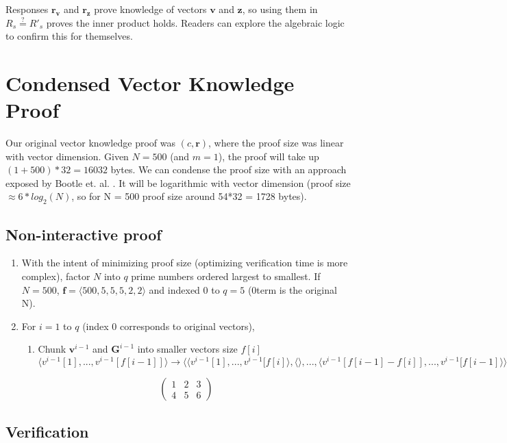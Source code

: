 Responses $\boldsymbol{r_v}$ and $\boldsymbol{r_z}$ prove knowledge of vectors $\boldsymbol{v}$ and $\boldsymbol{z}$, so using them in $R_s \stackrel{?}{=} R'_s$ proves the inner product holds. Readers can explore the algebraic logic to confirm this for themselves.


\section{Condensed Vector Knowledge Proof}
\label{sec:condensedvectorproof}

Our original vector knowledge proof was $(c, \boldsymbol{r})$, where the proof size was linear with vector dimension. Given $N = 500$ (and $m = 1$), the proof will take up $(1 + 500)*32 = 16032$ bytes. We can condense the proof size with an approach exposed by Bootle et. al. \cite{bootle-efficient-zkcircuits}. It will be logarithmic with vector dimension (proof size $\approx 6*log_2(N)$, so for N = 500 proof size around 54*32 = 1728 bytes).


\subsection*{Non-interactive proof}

\begin{enumerate}
    \item With the intent of minimizing proof size (optimizing verification time is more complex), factor $N$ into $q$ prime numbers ordered largest to smallest. If $N = 500$, $\boldsymbol{f} = \langle 500, 5, 5, 5, 2, 2 \rangle $ and indexed $0$ to $q = 5$ (0\nth term is the original N).
    \item For $i = 1$ to $q$ (index 0 corresponds to original vectors),
    \begin{enumerate}
        \item Chunk $\boldsymbol{v}^{i-1}$ and $\boldsymbol{G}^{i-1}$ into smaller vectors size $f[i]$
        \[ \langle v^{i-1}[1], ..., v^{i-1}[f[i-1]] \rangle \xrightarrow{} \langle \langle v^{i-1}[1],...,v^{i-1}[f[i] \rangle,\langle \rangle,...,\langle v^{i-1}[f[i-1] - f[i] ],..., v^{i-1}[f[i-1]\rangle \rangle \]
    \end{enumerate}
    \[\begin{pmatrix}
        1 & 2 & 3 \\
        4 & 5 & 6
    \end{pmatrix}\]
\end{enumerate}


\subsection*{Verification}
